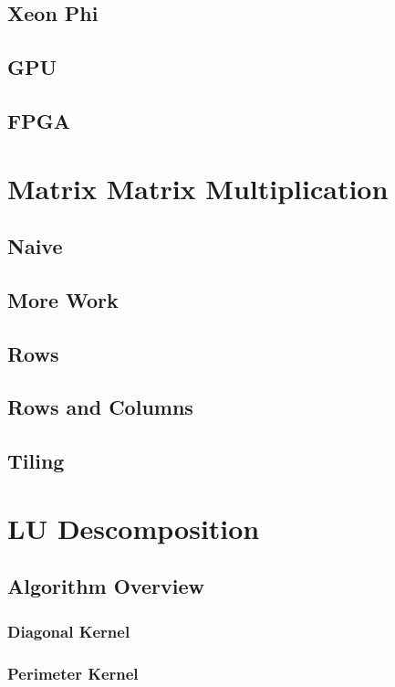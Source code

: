 \documentclass[fleqn,10pt,onecolumn]{ipcc} %
\begin{document}
\subsection{Xeon Phi}

\subsection{GPU}

\subsection{FPGA}

\section{Matrix Matrix Multiplication}

\subsection{Naive}
\label{sec:naive}

\subsection{More Work}
\label{sec:moreWork}

\subsection{Rows}
\label{sec:rows}

\subsection{Rows and Columns}
\label{sec:rowscols}

\subsection{Tiling}
\label{sec:tiling}

\section{LU Descomposition}

\subsection{Algorithm Overview}

\subsubsection{Diagonal Kernel}

\subsubsection{Perimeter Kernel}

\end{document}
